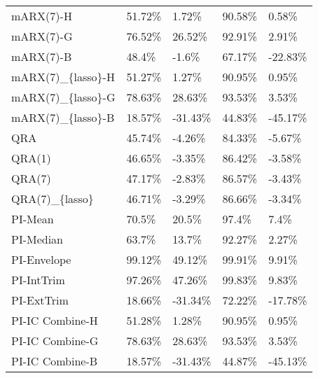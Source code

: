 \begin{tabular}{lllll}
mARX(7)-H         &  51.72\% &    1.72\% &  90.58\% &    0.58\% \\
mARX(7)-G         &  76.52\% &   26.52\% &  92.91\% &    2.91\% \\
mARX(7)-B         &   48.4\% &    -1.6\% &  67.17\% &  -22.83\% \\
mARX(7)\_\{lasso\}-H &  51.27\% &    1.27\% &  90.95\% &    0.95\% \\
mARX(7)\_\{lasso\}-G &  78.63\% &   28.63\% &  93.53\% &    3.53\% \\
mARX(7)\_\{lasso\}-B &  18.57\% &  -31.43\% &  44.83\% &  -45.17\% \\
QRA               &  45.74\% &   -4.26\% &  84.33\% &   -5.67\% \\
QRA(1)            &  46.65\% &   -3.35\% &  86.42\% &   -3.58\% \\
QRA(7)            &  47.17\% &   -2.83\% &  86.57\% &   -3.43\% \\
QRA(7)\_\{lasso\}    &  46.71\% &   -3.29\% &  86.66\% &   -3.34\% \\
PI-Mean           &   70.5\% &    20.5\% &   97.4\% &     7.4\% \\
PI-Median         &   63.7\% &    13.7\% &  92.27\% &    2.27\% \\
PI-Envelope       &  99.12\% &   49.12\% &  99.91\% &    9.91\% \\
PI-IntTrim        &  97.26\% &   47.26\% &  99.83\% &    9.83\% \\
PI-ExtTrim        &  18.66\% &  -31.34\% &  72.22\% &  -17.78\% \\
PI-IC Combine-H   &  51.28\% &    1.28\% &  90.95\% &    0.95\% \\
PI-IC Combine-G   &  78.63\% &   28.63\% &  93.53\% &    3.53\% \\
PI-IC Combine-B   &  18.57\% &  -31.43\% &  44.87\% &  -45.13\% \\
\bottomrule
\end{tabular}
